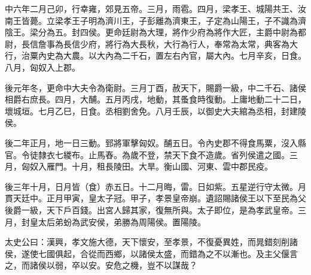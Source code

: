 \begin{pinyinscope}
中六年二月己卯，行幸雍，郊見五帝。三月，雨雹。四月，梁孝王、城陽共王、汝南王皆薨。立梁孝王子明為濟川王，子彭離為濟東王，子定為山陽王，子不識為濟陰王。梁分為五。封四侯。更命廷尉為大理，將作少府為將作大匠，主爵中尉為都尉，長信詹事為長信少府，將行為大長秋，大行為行人，奉常為太常，典客為大行，治粟內史為大農。以大內為二千石，置左右內官，屬大內。七月辛亥，日食。八月，匈奴入上郡。

後元年冬，更命中大夫令為衛尉。三月丁酉，赦天下，賜爵一級，中二千石、諸侯相爵右庶長。四月，大酺。五月丙戌，地動，其蚤食時復動。上庸地動二十二日，壞城垣。七月乙巳，日食。丞相劉舍免。八月壬辰，以御史大夫綰為丞相，封建陵侯。

後二年正月，地一日三動。郅將軍擊匈奴。酺五日。令內史郡不得食馬粟，沒入縣官。令徒隸衣七緵布。止馬舂。為歲不登，禁天下食不造歲。省列侯遣之國。三月，匈奴入雁門。十月，租長陵田。大旱。衡山國、河東、雲中郡民疫。

後三年十月，日月皆（食）赤五日。十二月晦，雷。日如紫。五星逆行守太微。月貫天廷中。正月甲寅，皇太子冠。甲子，孝景皇帝崩。遺詔賜諸侯王以下至民為父後爵一級，天下戶百錢。出宮人歸其家，復無所與。太子即位，是為孝武皇帝。三月，封皇太后弟蚡為武安侯，弟勝為周陽侯。置陽陵。

太史公曰：漢興，孝文施大德，天下懷安，至孝景，不復憂異姓，而晁錯刻削諸侯，遂使七國俱起，合從而西鄉，以諸侯太盛，而錯為之不以漸也。及主父偃言之，而諸侯以弱，卒以安。安危之機，豈不以謀哉？


\end{pinyinscope}